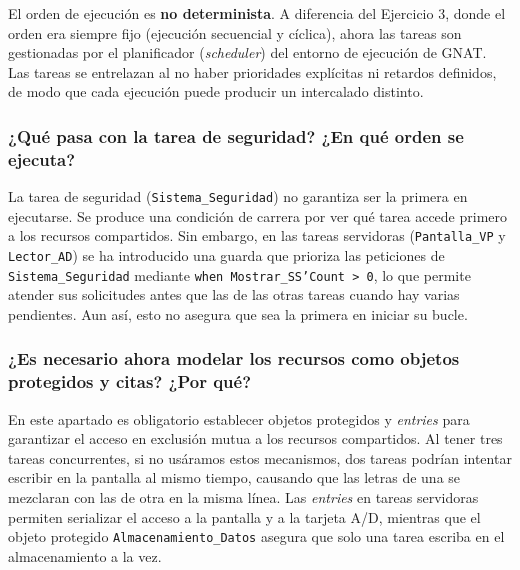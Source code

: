 El orden de ejecución es \textbf{no determinista}. A diferencia del Ejercicio 3, donde el orden era siempre fijo (ejecución secuencial y cíclica), ahora las tareas son gestionadas por el planificador (\textit{scheduler}) del entorno de ejecución de GNAT. Las tareas se entrelazan al no haber prioridades explícitas ni retardos definidos, de modo que cada ejecución puede producir un intercalado distinto.

\subsubsection{¿Qué pasa con la tarea de seguridad? ¿En qué orden se ejecuta?}

La tarea de seguridad (\texttt{Sistema\_Seguridad}) no garantiza ser la primera en ejecutarse. Se produce una condición de carrera por ver qué tarea accede primero a los recursos compartidos. Sin embargo, en las tareas servidoras (\texttt{Pantalla\_VP} y \texttt{Lector\_AD}) se ha introducido una guarda que prioriza las peticiones de \texttt{Sistema\_Seguridad} mediante \texttt{when Mostrar\_SS'Count > 0}, lo que permite atender sus solicitudes antes que las de las otras tareas cuando hay varias pendientes. Aun así, esto no asegura que sea la primera en iniciar su bucle.

\subsubsection{¿Es necesario ahora modelar los recursos como objetos protegidos y citas? ¿Por qué?}

En este apartado es obligatorio establecer objetos protegidos y \textit{entries} para garantizar el acceso en exclusión mutua a los recursos compartidos. Al tener tres tareas concurrentes, si no usáramos estos mecanismos, dos tareas podrían intentar escribir en la pantalla al mismo tiempo, causando que las letras de una se mezclaran con las de otra en la misma línea. Las \textit{entries} en tareas servidoras permiten serializar el acceso a la pantalla y a la tarjeta A/D, mientras que el objeto protegido \texttt{Almacenamiento\_Datos} asegura que solo una tarea escriba en el almacenamiento a la vez.
